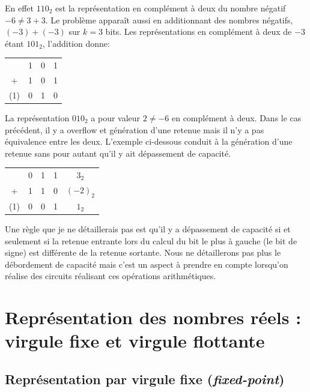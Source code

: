 En effet $110_2$ est la représentation en complément à deux du nombre négatif $-6 \neq 3 + 3$. Le problème apparaît aussi en additionnant des nombres négatifs, $(-3) + (-3)$ sur $k=3$ bits. Les représentations en complément à deux de $-3$ étant $101_2$, l'addition donne:

\begin{tabular}{cccc}
& 1& 0 & 1\\
+& 1 & 0 & 1 \\
\hline
(1) & 0 & 1 & 0
\end{tabular}

La représentation $010_2$ a pour valeur $2 \neq -6$ en complément à deux. Dans le cas précédent, il y a overflow et génération d'une retenue mais il n'y a pas équivalence entre les deux. L'exemple ci-dessous conduit à la génération d'une retenue sans pour autant qu'il y ait dépassement de capacité.
\begin{tabular}{ccccc}
    & 0 & 1 & 1 & $3_2$\\
+   & 1 & 1 & 0 & $(-2)_2$\\
\hline
(1) & 0 & 0 & 1 & $1_2$
\end{tabular}

Une règle que je ne détaillerais pas est qu'il y a dépassement de capacité si et seulement si la retenue entrante lors du calcul du bit le plus à gauche (le bit de signe) est différente de la retenue sortante. Nous ne détaillerons pas plus le débordement de capacité mais c'est un aspect à prendre en compte lorsqu'on réalise des circuits réalisant ces opérations arithmétiques.






\section{Représentation des nombres réels : virgule fixe et virgule flottante}

\subsection{Représentation par virgule fixe (\emph{fixed-point})}

